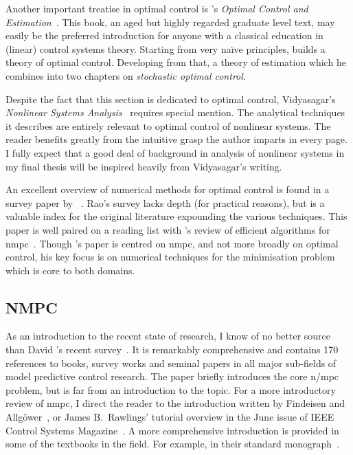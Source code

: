 Another important treatise in optimal control is
\citeauthor{stengel1986optimal}'s \emph{Optimal Control and
Estimation}~\cite{stengel1986optimal}. This book, an aged but highly regarded
graduate level text, may easily be the preferred introduction for anyone with a
classical education in (linear) control systems theory. Starting from very
naïve principles, \citeauthor{stengel1986optimal} builds a theory of optimal
control. Developing from that, a theory of estimation which he combines into two
chapters on \emph{stochastic optimal control.}

Despite the fact that this section is dedicated to optimal control, Vidyasagar's
\emph{Nonlinear Systems Analysis}~\cite{Vidyasagar2002} requires special
mention. The analytical techniques it describes are entirely relevant to optimal
control of nonlinear systems. The reader benefits greatly from the intuitive
grasp the author imparts in every page. I fully expect that a good deal of
background in analysis of nonlinear systems in my final thesis will be inspired
heavily from Vidyasagar's writing.

An excellent overview of numerical methods for optimal control is found in a
survey paper by \citeauthor{rao2009survey}~\cite{rao2009survey}. Rao's survey
lacks depth (for practical reasons), but is a valuable index for the original
literature expounding the various techniques. This paper is well paired on a
reading list with \citeauthor{Cannon2004}'s review of efficient algorithms for
\ac{nmpc}~\cite{Cannon2004}. Though \citeauthor{Cannon2004}'s paper is centred
on \ac{nmpc}, and not more broadly on optimal control, his key focus is on
numerical techniques for the minimisation problem which is core to both domains.



\subsection{NMPC}


As an introduction to the recent state of research, I know of no better source
than David \citeauthor{Mayne2014}'s recent survey~\cite{Mayne2014}. It is
remarkably comprehensive and contains 170 references to books, survey works and
seminal papers in all major sub-fields of model predictive control research. The
paper briefly introduces the core \ac{n/mpc} problem, but is far from an
introduction to the topic. For a more introductory review of \ac{nmpc}, I direct
the reader to the introduction written by Findeisen and
Allgöwer~\cite{Findeisen2002}, or James B.\ Rawlings' tutorial overview in the
June  issue of IEEE Control Systems Magazine~\cite{Rawlings2000}. A
more comprehensive introduction is provided in some of the textbooks in the
field. For example, \citeauthor{Grune2011} in their standard
monograph~\cite{Grune2011}.

